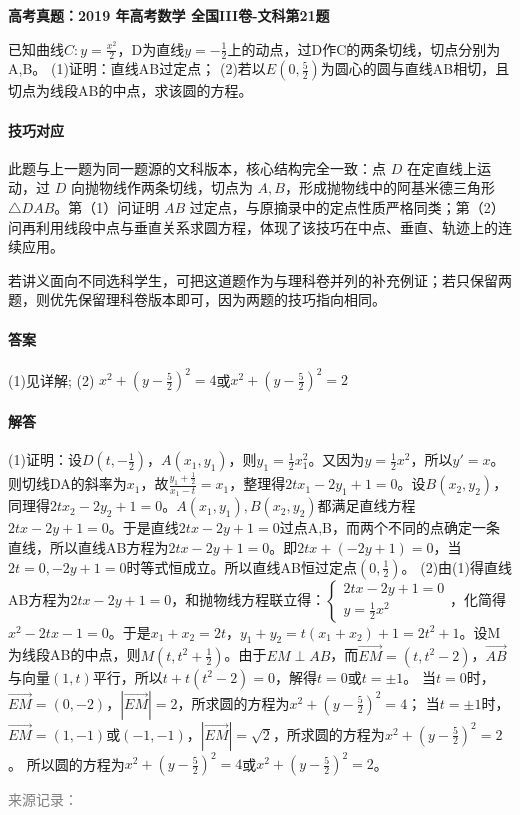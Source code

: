 \documentclass[UTF8,a4paper,11pt]{ctexart}
\newenvironment{gaokao}[1]{\par\medskip\noindent\textbf{高考真题：#1}\par\smallskip}{\par\medskip}
\begin{document}
\begin{gaokao}{2019 年高考数学 全国III卷-文科第21题}

已知曲线$C:y=\frac{x^2}{2}$，D为直线$y=-\frac{1}{2}$上的动点，过D作C的两条切线，切点分别为A,B。
(1)证明：直线AB过定点；
(2)若以$E(0,\frac{5}{2})$为圆心的圆与直线AB相切，且切点为线段AB的中点，求该圆的方程。

\paragraph{技巧对应}

此题与上一题为同一题源的文科版本，核心结构完全一致：点 $D$ 在定直线上运动，过 $D$ 向抛物线作两条切线，切点为 $A,B$，形成抛物线中的阿基米德三角形 $\triangle DAB$。第（1）问证明 $AB$ 过定点，与原摘录中的定点性质严格同类；第（2）问再利用线段中点与垂直关系求圆方程，体现了该技巧在中点、垂直、轨迹上的连续应用。

若讲义面向不同选科学生，可把这道题作为与理科卷并列的补充例证；若只保留两题，则优先保留理科卷版本即可，因为两题的技巧指向相同。

\paragraph{答案}

(1)见详解; (2) $x^2+(y-\frac{5}{2})^2=4$或$x^2+(y-\frac{5}{2})^2=2$

\paragraph{解答}

(1)证明：设$D(t,-\frac{1}{2})$，$A(x_1,y_1)$，则$y_1=\frac{1}{2}x_1^2$。又因为$y=\frac{1}{2}x^2$，所以$y'=x$。则切线DA的斜率为$x_1$，故$\frac{y_1+\frac{1}{2}}{x_1-t}=x_1$，整理得$2tx_1-2y_1+1=0$。设$B(x_2,y_2)$，同理得$2tx_2-2y_2+1=0$。$A(x_1,y_1),B(x_2,y_2)$都满足直线方程$2tx-2y+1=0$。于是直线$2tx-2y+1=0$过点A,B，而两个不同的点确定一条直线，所以直线AB方程为$2tx-2y+1=0$。即$2tx+(-2y+1)=0$，当$2t=0,-2y+1=0$时等式恒成立。所以直线AB恒过定点$(0,\frac{1}{2})$。
(2)由(1)得直线AB方程为$2tx-2y+1=0$，和抛物线方程联立得：$\begin{cases} 2tx-2y+1=0 \\ y=\frac{1}{2}x^2 \end{cases}$，化简得$x^2-2tx-1=0$。于是$x_1+x_2=2t$，$y_1+y_2=t(x_1+x_2)+1=2t^2+1$。设M为线段AB的中点，则$M(t,t^2+\frac{1}{2})$。由于$EM\perp AB$，而$\overrightarrow{EM}=(t,t^2-2)$，$\overrightarrow{AB}$与向量$(1,t)$平行，所以$t+t(t^2-2)=0$，解得$t=0$或$t=\pm1$。
当$t=0$时，$\overrightarrow{EM}=(0,-2)$，$|\overrightarrow{EM}|=2$，所求圆的方程为$x^2+(y-\frac{5}{2})^2=4$；
当$t=\pm1$时，$\overrightarrow{EM}=(1,-1)$或$(-1,-1)$，$|\overrightarrow{EM}|=\sqrt{2}$，所求圆的方程为$x^2+(y-\frac{5}{2})^2=2$。
所以圆的方程为$x^2+(y-\frac{5}{2})^2=4$或$x^2+(y-\frac{5}{2})^2=2$。

\par\smallskip\textcolor{gray}{\footnotesize 来源记录：\texttt{}}

\end{gaokao}
\end{document}
